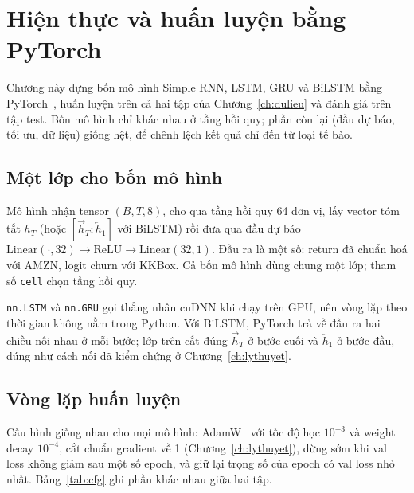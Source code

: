 \chapter{Hiện thực và huấn luyện bằng PyTorch}
\label{ch:pytorch}

Chương này dựng bốn mô hình Simple RNN, LSTM, GRU và BiLSTM bằng PyTorch~\cite{paszke2019}, huấn luyện trên cả hai
tập của Chương~\ref{ch:dulieu} và đánh giá trên tập test. Bốn mô hình chỉ khác nhau ở tầng hồi quy; phần còn lại
(đầu dự báo, tối ưu, dữ liệu) giống hệt, để chênh lệch kết quả chỉ đến từ loại tế bào.

\section{Một lớp cho bốn mô hình}

Mô hình nhận tensor $(B, T, 8)$, cho qua tầng hồi quy 64 đơn vị, lấy vector tóm tắt $h_T$ (hoặc
$[\overrightarrow{h}_T; \overleftarrow{h}_1]$ với BiLSTM) rồi đưa qua đầu dự báo
$\mathrm{Linear}(\cdot, 32) \to \mathrm{ReLU} \to \mathrm{Linear}(32, 1)$. Đầu ra là một số: return đã chuẩn hoá với
AMZN, logit churn với KKBox. Cả bốn mô hình dùng chung một lớp; tham số \texttt{cell} chọn tầng hồi quy.


\texttt{nn.LSTM} và \texttt{nn.GRU} gọi thẳng nhân cuDNN khi chạy trên GPU, nên vòng lặp theo thời gian không nằm
trong Python. Với BiLSTM, PyTorch trả về đầu ra hai chiều nối nhau ở mỗi bước; lớp trên cắt đúng
$\overrightarrow{h}_T$ ở bước cuối và $\overleftarrow{h}_1$ ở bước đầu, đúng như cách nối đã kiểm chứng ở
Chương~\ref{ch:lythuyet}.

\section{Vòng lặp huấn luyện}

Cấu hình giống nhau cho mọi mô hình: AdamW~\cite{loshchilov2019} với tốc độ học $10^{-3}$ và weight decay $10^{-4}$, cắt chuẩn gradient về 1 (Chương~\ref{ch:lythuyet}), dừng sớm khi val loss không
giảm sau một số epoch, và giữ lại trọng số của epoch có val loss nhỏ nhất. Bảng~\ref{tab:cfg} ghi phần khác nhau giữa hai
tập.

